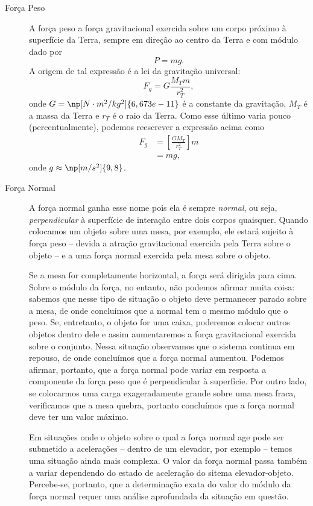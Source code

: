 \begin{description}
	\item[Força Peso] A força peso a força gravitacional exercida sobre um corpo próximo à superfície da Terra, sempre em direção ao centro da Terra e com módulo dado por
	\begin{equation}
		P = mg.
	\end{equation}
	A origem de tal expressão é a lei da gravitação universal:
	\begin{equation}
		F_g = G \frac{M_T m}{r_T^2},
	\end{equation}
	onde $G = \np[N\cdot m^2/kg^2]{6,673e-11}$ é a constante da gravitação, $M_T$ é a massa da Terra e $r_T$ é o raio da Terra. Como esse último varia pouco (percentualmente), podemos reescrever a expressão acima como
	\begin{align}
		F_g &= \left[\frac{G M_T}{r_T^2}\right] m \\
			&= mg,
	\end{align}
	onde $g \approx \np[m/s^2]{9,8}$.

\item[Força Normal] A força normal ganha esse nome pois ela é sempre \emph{normal}, ou seja, \emph{perpendicular} à superfície de interação entre dois corpos quaisquer. Quando colocamos um objeto sobre uma mesa, por exemplo, ele estará sujeito à força peso -- devida a atração gravitacional exercida pela Terra sobre o objeto -- e a uma força normal exercida pela mesa sobre o objeto.
	
	Se a mesa for completamente horizontal, a força será dirigida para cima. Sobre o módulo da força, no entanto, não podemos afirmar muita coisa: sabemos que nesse tipo de situação o objeto deve permanecer parado sobre a mesa, de onde concluímos que a normal tem o mesmo módulo que o peso. Se, entretanto, o objeto for uma caixa, poderemos colocar outros objetos dentro dele e assim aumentaremos a força gravitacional exercida sobre o conjunto. Nessa situação observamos que o sistema continua em repouso, de onde concluímos que a força normal aumentou. Podemos afirmar, portanto, que a força normal pode variar em resposta a componente da força peso que é perpendicular à superfície. Por outro lado, se colocarmos uma carga exageradamente grande sobre uma mesa fraca, verificamos que a mesa quebra, portanto concluímos que a força normal deve ter um valor máximo.

	Em situações onde o objeto sobre o qual a força normal age pode ser submetido a acelerações -- dentro de um elevador, por exemplo -- temos uma situação ainda mais complexa. O valor da força normal passa também a variar dependendo do estado de aceleração do sitema elevador-objeto. Percebe-se, portanto, que a determinação exata do valor do módulo da força normal requer uma análise aprofundada da situação em questão.


\end{description}
